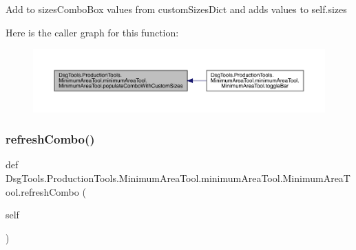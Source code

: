 \begin{DoxyVerb}Add to sizesComboBox values from customSizesDict and adds values to self.sizes 
\end{DoxyVerb}
 Here is the caller graph for this function\+:
\nopagebreak
\begin{figure}[H]
\begin{center}
\leavevmode
\includegraphics[width=350pt]{class_dsg_tools_1_1_production_tools_1_1_minimum_area_tool_1_1minimum_area_tool_1_1_minimum_area_tool_aa624ad8ccdd55bed86830ea433094846_icgraph}
\end{center}
\end{figure}
\mbox{\label{class_dsg_tools_1_1_production_tools_1_1_minimum_area_tool_1_1minimum_area_tool_1_1_minimum_area_tool_aae4bdecc9b1109f79fae162465368f69}} 
\subsubsection{\texorpdfstring{refresh\+Combo()}{refreshCombo()}}
{\footnotesize\ttfamily def Dsg\+Tools.\+Production\+Tools.\+Minimum\+Area\+Tool.\+minimum\+Area\+Tool.\+Minimum\+Area\+Tool.\+refresh\+Combo (\begin{DoxyParamCaption}\item[{}]{self }\end{DoxyParamCaption})}

